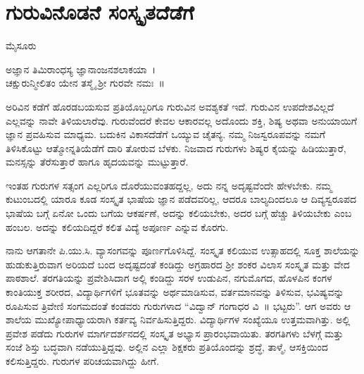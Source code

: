 {\fontsize{14}{16}\selectfont
\chapter{ಗುರುವಿನೊಡನೆ ಸಂಸ್ಕೃತದೆಡೆಗೆ}

\begin{center}
\smallskip

ಮೈಸೂರು 
\addrule
\end{center}

\begin{center}
ಅಜ್ಞಾನ ತಿಮಿರಾಂಧಸ್ಯ ಜ್ಞಾನಾಂಜನಶಲಾಕಯಾ~।\\
ಚಕ್ಷುರುನ್ಮೀಲಿತಂ ಯೇನ ತಸ್ಮೈ ಶ್ರೀ ಗುರವೇ ನಮಃ~॥
\end{center}
ಅರಿವಿನ ಕಡೆಗೆ ಹೊರಡಬಯಸುವ ಪ್ರತಿಯೊಬ್ಬರಿಗೂ ಗುರುವಿನ ಅವಶ್ಯಕತೆ ಇದೆ. ಗುರುವಿನ ಉಪದೇಶವಿಲ್ಲದೆ ಎಲ್ಲವನ್ನು ನಾವೇ ತಿಳಿಯಲಾರೆವು. ಗುರುವೆಂದರೆ ಕೇವಲ ಆಕಾರವಲ್ಲ ಅದೊಂದು ಶಕ್ತಿ, ಶಿಷ್ಯ ಅಥವಾ ಅನುಯಾಯಿಗೆ ಜ್ಞಾನ ಪ್ರವಹಿಸುವ ಮಾಧ್ಯಮ. ಬದುಕಿನ ವಿಕಾಸದೆಡೆಗೆ ಒಯ್ಯುವ ಚೈತನ್ಯ. ನಮ್ಮ ನಿಜಸ್ವರೂಪವನ್ನು ನಮಗೆ ತಿಳಿಸಿಕೊಟ್ಟು ಆತ್ಮೋನ್ನತಿಯೆಡೆಗೆ ದಾರಿ ತೋರುವ ಬೆಳಕು. ನಿಜವಾದ ಗುರುಗಳು ಶಿಷ್ಯರ ಕೈಯನ್ನು ಹಿಡಿಯುತ್ತಾರೆ, ಮನಸ್ಸನ್ನು ತೆರೆಸುತ್ತಾರೆ ಹಾಗೂ ಹೃದಯವನ್ನು ಮುಟ್ಟುತ್ತಾರೆ.

ಇಂತಹ ಗುರುಗಳ ಸತ್ಸಂಗ ಎಲ್ಲರಿಗೂ ದೊರೆಯುವಂತಹದ್ದಲ್ಲ, ಅದು ನನ್ನ ಅದೃಷ್ಟವೆಂದೇ ಹೇಳಬೇಕು. ನಮ್ಮ ಕುಟುಂಬದಲ್ಲಿ ಯಾರೂ ಕೂಡ ಸಂಸ್ಕೃತ ಭಾಷೆಯ ಜ್ಞಾನ ಪಡೆದವರಿಲ್ಲ, ಆದರೂ ಬಾಲ್ಯದಿಂದಲೂ ಆ ದಿವ್ಯಸ್ವರೂಪದ ಭಾಷೆಯ ಬಗ್ಗೆ ಏನೋ ಒಂದು ಬಗೆಯ ಆಕರ್ಷಣೆ, ಅದನ್ನು ಕಲಿಯಬೇಕು, ಅದರ ಬಗ್ಗೆ ಹೆಚ್ಚು ತಿಳಿಯಬೇಕು ಎಂಬ ಹಂಬಲ. ಅದನ್ನು ಕಲಿಯದಿದ್ದರೆ ಕಲಿತ ವಿದ್ಯೆ ಅಪೂರ್ಣ ಎನ್ನುವ ಕೊರಗು. 

ನಾನು ಆಗತಾನೇ ಪಿ.ಯು.ಸಿ. ವ್ಯಾಸಂಗವನ್ನು ಪೂರ್ಣಗೊಳಿಸಿದ್ದೆ. ಸಂಸ್ಕೃತ ಕಲಿಯುವ ಉತ್ಸಾಹದಲ್ಲಿ ಸೂಕ್ತ ಶಾಲೆಯನ್ನು ಹುಡುಕುತ್ತಿರುವಾಗ ಅರಿಯದೆ ಬಂದ ಅದೃಷ್ಟ\-ದಂತೆ ಕಂಡಿದ್ದು ಅಗ್ರಹಾರದ ಶ್ರೀ ಶಂಕರ ವಿಲಾಸ ಸಂಸ್ಕೃತ ಮತ್ತು ವೇದ ಪಾಠಶಾಲೆ. ತರಗತಿಯನ್ನು ಪ್ರವೇಶಿಸಿದಾಗ ಅಲ್ಲಿ ಕಂಡಿದ್ದು ಸರಳ ಉಡುಪಿನ, ನಗು\-ಮೊಗದ, ಹೊಳಪಿನ ಕಂಗಳ ಕಾಂತಿಯುಕ್ತ ಶರೀರದ, ವಿದ್ಯಾರ್ಥಿಗಳಿಗೆ ಭೂತವನ್ನು ಅರ್ಥ\-ಮಾಡಿಸುವ, ವರ್ತಮಾನವನ್ನು ತಿಳಿಸುವ, ಭವಿಷ್ಯವನ್ನು ರೂಪಿಸುವ ತ್ರಿವೇಣಿ ಸಂಗಮದಂತೆ ಕಂಡವರು ಗುರುಗಳಾದ “ವಿದ್ವಾನ್ ಗಂಗಾಧರ ವಿ~॥ ಭಟ್ಟರು”. ಆಗ ಅವರು ಆ ಶಾಲೆಯ ಮುಖ್ಯೋಪಾಧ್ಯಾಯರಾಗಿ ಕರ್ತವ್ಯ ನಿರ್ವಹಿಸುತ್ತಿದ್ದರು. ವಿದ್ಯಾರ್ಥಿ\-ಗಳ ಸಂಖ್ಯೆಯೂ ಉತ್ತಮವಾಗಿತ್ತು. ಅಲ್ಲಿ ಪ್ರವೇಶ ಪಡೆದು ಗುರುಗಳ ಮಾರ್ಗದರ್ಶನದಲ್ಲಿ ಸಂಸ್ಕೃತ ಅಭ್ಯಾಸ ಪ್ರಾರಂಭವಾಯಿತು. ತರಗತಿಗಳು ಬೆಳಗ್ಗೆ ಮತ್ತು ಸಂಜೆ ಶಿಸ್ತು ಬದ್ಧವಾಗಿ ನಡೆಯುತ್ತಿದ್ದವು. ಅಲ್ಲಿನ ಎಲ್ಲಾ ಶಿಕ್ಷಕರು ಪ್ರತಿಯೊಂದನ್ನು ಶ್ರದ್ಧೆ, ತಾಳ್ಮೆ, ಆಸಕ್ತಿಯಿಂದ ಕಲಿಸುತ್ತಿದ್ದರು. ಗುರುಗಳ ಪರಿಚಯವಾಗಿದ್ದು ಹೀಗೆ.

}
